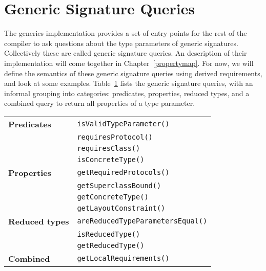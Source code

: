 \documentclass[../generics]{subfiles}
\begin{document}
\section{Generic Signature Queries}\label{genericsigqueries}
The generics implementation provides a set of entry points for the rest of the compiler to ask questions about the type parameters of generic signatures. Collectively these are called generic signature queries. An description of their implementation will come together in Chapter~\ref{propertymap}. For now, we will define the semantics of these generic signature queries using derived requirements, and look at some examples. Table~\ref{genericsigquerytable} lists the generic signature queries, with an informal grouping into categories: predicates, properties, reduced types, and a combined query to return all properties of a type parameter.

\begin{table}\label{genericsigquerytable}
\begin{center}
\begin{tabular}{ll}
\toprule
\textbf{Predicates}&\texttt{isValidTypeParameter()}\\
&\texttt{requiresProtocol()}\\
&\texttt{requiresClass()}\\
&\texttt{isConcreteType()}\\
\midrule
\textbf{Properties}&\texttt{getRequiredProtocols()}\\
&\texttt{getSuperclassBound()}\\
&\texttt{getConcreteType()}\\
&\texttt{getLayoutConstraint()}\\
\midrule
\textbf{Reduced types}&\texttt{areReducedTypeParametersEqual()}\\
&\texttt{isReducedType()}\\
&\texttt{getReducedType()}\\
\midrule
\textbf{Combined}&\texttt{getLocalRequirements()}\\
\bottomrule
\end{tabular}
\end{center}
\end{table}
\end{document}
